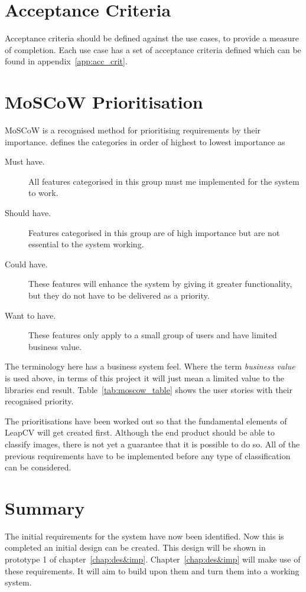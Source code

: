 \documentclass[11pt,oneside]{report}
\begin{document}
		\section{Acceptance Criteria}
			Acceptance criteria should be defined against the use cases, to provide a measure of completion.
			Each use case has a set of acceptance criteria defined which can be found in appendix~\ref{app:acc_crit}.
		\section{MoSCoW Prioritisation}
			MoSCoW is a recognised method for prioritising requirements by their importance.  defines the categories in order of highest to lowest importance as
			\begin{description}
				\item[Must have. ] All features categorised in this group must me implemented for the system to work.
				\item[Should have. ] Features categorised in this group are of high importance but are not essential to the system working.
				\item[Could have. ] These features will enhance the system by giving it greater functionality, but they do not have to be delivered as a priority.
				\item[Want to have. ] These features only apply to a small group of users and have limited business value.
			\end{description}
			The terminology here has a business system feel.
			Where the term \textit{business value} is used above, in terms of this project it will just mean a limited value to the libraries end result.
			Table~\ref{tab:moscow_table} shows the user stories with their recognised priority.
			
			\clearpage
			The prioritisations have been worked out so that the fundamental elements of LeapCV will get created first.
			Although the end product should be able to classify images, there is not yet a guarantee that it is possible to do so.
			All of the previous requirements have to be implemented before any type of classification can be considered.
		\section{Summary}
			The initial requirements for the system have now been identified.
			Now this is completed an initial design can be created.
			This design will be shown in prototype 1 of chapter~\ref{chap:des&imp}.
			Chapter~\ref{chap:des&imp} will make use of these requirements.
			It will aim to build upon them and turn them into a working system.
    		
\end{document}
